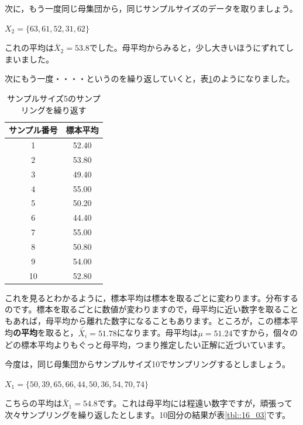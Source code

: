 \documentclass{ltjsbook}
\begin{document}
次に，もう一度同じ母集団から，同じサンプルサイズのデータを取りましょう。

\begin{tcolorbox}
	$X_2 = \{  63, 61, 52, 31, 62\}$
\end{tcolorbox}

これの平均は$\bar{X}_2=53.8$でした。母平均からみると，少し大きいほうにずれてしまいました。

次にもう一度・・・・というのを繰り返していくと，表\ref{tbl::16_02}のようになりました。

\begin{table}[ht]
	\centering
	\caption{サンプルサイズ5のサンプリングを繰り返す}
	\begin{tabular}{cc}
		\hline
		サンプル番号 & 標本平均  \\
		\hline
		1      & 52.40 \\
		2      & 53.80 \\
		3      & 49.40 \\
		4      & 55.00 \\
		5      & 50.20 \\
		6      & 44.40 \\
		7      & 55.00 \\
		8      & 50.80 \\
		9      & 54.00 \\
		10     & 52.80 \\
		\hline
	\end{tabular}
	\label{tbl::16_02}
\end{table}

これを見るとわかるように，標本平均は標本を取るごとに変わります。分布するのです。標本を取るごとに数値が変わりますので，母平均に近い数字を取ることもあれば，母平均から離れた数字になることもあります。ところが，この標本平均\textbf{の平均}を取ると，$\bar{\bar{X}_i}=51.78$になります。母平均は$\mu=51.24$ですから，個々のどの標本平均よりもぐっと母平均，つまり推定したい正解に近づいています。

今度は，同じ母集団からサンプルサイズ10でサンプリングするとしましょう。
\begin{tcolorbox}
	$ X_1=\{50, 39, 65, 66, 44, 50, 36, 54, 70, 74\}$
\end{tcolorbox}
こちらの平均は$\bar{X}_1=54.8$です。これは母平均には程遠い数字ですが，頑張って次々サンプリングを繰り返したとします。10回分の結果が表\ref{tbl::16_03}です。
\end{document}
